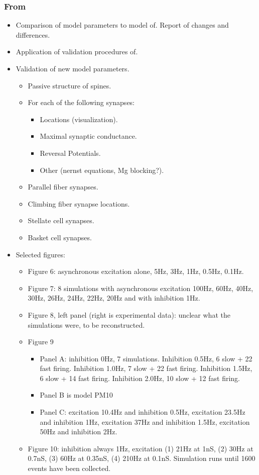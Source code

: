 \documentclass[12pt]{article}
\begin{document}
\subsubsection*{From~\cite{E:1994hc}}

\begin{itemize}
\item Comparison of model parameters to model
  of\cite{De-Schutter-E:1994vn}.  Report of changes and differences.
\item Application of validation procedures
  of\cite{De-Schutter-E:1994vn}.
\item Validation of new model parameters.
  \begin{itemize}
  \item Passive structure of spines.
  \item For each of the following synapses:
    \begin{itemize}
    \item Locations (visualization).
    \item Maximal synaptic conductance.
    \item Reversal Potentials.
    \item Other (nernst equations, Mg blocking?).
    \end{itemize}
  \item Parallel fiber synapses.
  \item Climbing fiber synapse locations.
  \item Stellate cell synapses.
  \item Basket cell synapses.
  \end{itemize}
\item Selected figures:
  \begin{itemize}
  \item Figure 6: asynchronous excitation alone, 5Hz, 3Hz, 1Hz, 0.5Hz,
    0.1Hz.
  \item Figure 7: 8 simulations with asynchronous excitation 100Hz,
    60Hz, 40Hz, 30Hz, 26Hz, 24Hz, 22Hz, 20Hz and with inhibition 1Hz.
  \item Figure 8, left panel (right is experimental data): unclear
    what the simulations were, to be reconstructed.
  \item Figure 9
    \begin{itemize}
    \item Panel A: inhibition 0Hz, 7 simulations.  Inhibition 0.5Hz, 6
      slow + 22 fast firing.  Inhibition 1.0Hz, 7 slow + 22 fast
      firing.  Inhibition 1.5Hz, 6 slow + 14 fast firing.  Inhibition
      2.0Hz, 10 slow + 12 fast firing.
    \item Panel B is model PM10
    \item Panel C: excitation 10.4Hz and inhibition 0.5Hz, excitation
      23.5Hz and inhibition 1Hz, excitation 37Hz and inhibition 1.5Hz,
      excitation 50Hz and inhibition 2Hz.
    \end{itemize}
  \item Figure 10: inhibition always 1Hz, excitation (1) 21Hz at 1nS,
    (2) 30Hz at 0.7nS, (3) 60Hz at 0.35nS, (4) 210Hz at 0.1nS.
    Simulation runs until 1600 events have been collected.
  \end{itemize}
\end{itemize}
\end{document}
